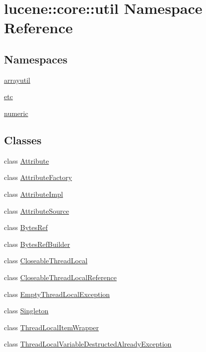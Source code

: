\hypertarget{namespacelucene_1_1core_1_1util}{}\section{lucene\+:\+:core\+:\+:util Namespace Reference}
\label{namespacelucene_1_1core_1_1util}
\subsection*{Namespaces}
\begin{DoxyCompactItemize}
\item 
 \mbox{\hyperlink{namespacelucene_1_1core_1_1util_1_1arrayutil}{arrayutil}}
\item 
 \mbox{\hyperlink{namespacelucene_1_1core_1_1util_1_1etc}{etc}}
\item 
 \mbox{\hyperlink{namespacelucene_1_1core_1_1util_1_1numeric}{numeric}}
\end{DoxyCompactItemize}
\subsection*{Classes}
\begin{DoxyCompactItemize}
\item 
class \mbox{\hyperlink{classlucene_1_1core_1_1util_1_1Attribute}{Attribute}}
\item 
class \mbox{\hyperlink{classlucene_1_1core_1_1util_1_1AttributeFactory}{Attribute\+Factory}}
\item 
class \mbox{\hyperlink{classlucene_1_1core_1_1util_1_1AttributeImpl}{Attribute\+Impl}}
\item 
class \mbox{\hyperlink{classlucene_1_1core_1_1util_1_1AttributeSource}{Attribute\+Source}}
\item 
class \mbox{\hyperlink{classlucene_1_1core_1_1util_1_1BytesRef}{Bytes\+Ref}}
\item 
class \mbox{\hyperlink{classlucene_1_1core_1_1util_1_1BytesRefBuilder}{Bytes\+Ref\+Builder}}
\item 
class \mbox{\hyperlink{classlucene_1_1core_1_1util_1_1CloseableThreadLocal}{Closeable\+Thread\+Local}}
\item 
class \mbox{\hyperlink{classlucene_1_1core_1_1util_1_1CloseableThreadLocalReference}{Closeable\+Thread\+Local\+Reference}}
\item 
class \mbox{\hyperlink{classlucene_1_1core_1_1util_1_1EmptyThreadLocalException}{Empty\+Thread\+Local\+Exception}}
\item 
class \mbox{\hyperlink{classlucene_1_1core_1_1util_1_1Singleton}{Singleton}}
\item 
class \mbox{\hyperlink{classlucene_1_1core_1_1util_1_1ThreadLocalItemWrapper}{Thread\+Local\+Item\+Wrapper}}
\item 
class \mbox{\hyperlink{classlucene_1_1core_1_1util_1_1ThreadLocalVariableDestructedAlreadyException}{Thread\+Local\+Variable\+Destructed\+Already\+Exception}}
\end{DoxyCompactItemize}
